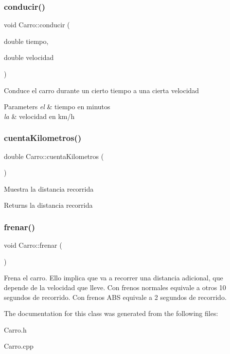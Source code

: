 \subsubsection{\texorpdfstring{conducir()}{conducir()}}
{\footnotesize\ttfamily void Carro\+::conducir (\begin{DoxyParamCaption}\item[{double}]{tiempo,  }\item[{double}]{velocidad }\end{DoxyParamCaption})\hspace{0.3cm}{\ttfamily [virtual]}}

Conduce el carro durante un cierto tiempo a una cierta velocidad 
\begin{DoxyParams}{Parameters}
{\em el} & tiempo en minutos \\
\hline
{\em la} & velocidad en km/h \\
\hline
\end{DoxyParams}
\mbox{\label{classCarro_a063538e705b4f696a13e147b52ded211}} 
\subsubsection{\texorpdfstring{cuenta\+Kilometros()}{cuentaKilometros()}}
{\footnotesize\ttfamily double Carro\+::cuenta\+Kilometros (\begin{DoxyParamCaption}{ }\end{DoxyParamCaption})\hspace{0.3cm}{\ttfamily [virtual]}}

Muestra la distancia recorrida \begin{DoxyReturn}{Returns}
la distancia recorrida 
\end{DoxyReturn}
\mbox{\label{classCarro_a0e55d35b86532d04dbbb56087fbd2079}} 
\subsubsection{\texorpdfstring{frenar()}{frenar()}}
{\footnotesize\ttfamily void Carro\+::frenar (\begin{DoxyParamCaption}{ }\end{DoxyParamCaption})\hspace{0.3cm}{\ttfamily [virtual]}}

Frena el carro. Ello implica que va a recorrer una distancia adicional, que depende de la velocidad que lleve. Con frenos normales equivale a otros 10 segundos de recorrido. Con frenos A\+BS equivale a 2 segundos de recorrido. 

The documentation for this class was generated from the following files\+:\begin{DoxyCompactItemize}
\item 
Carro.\+h\item 
Carro.\+cpp\end{DoxyCompactItemize}
